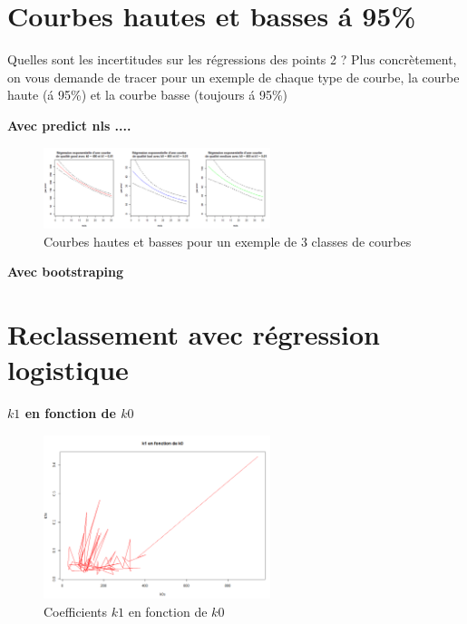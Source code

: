 \documentclass[12pt]{article}
\begin{document}
\section{Courbes hautes et basses \'a 95\%}

Quelles sont les incertitudes sur les r\'egressions des points 2 ? Plus concr\`etement, on
vous demande de tracer pour un exemple de chaque type de courbe, la courbe haute (\'a
95\%) et la courbe basse (toujours \'a 95\%)

\textbf{Avec predict nls ....}

\begin{figure}[H]
 \centering %
	\includegraphics[width=250px]{q3_predict_nls}
  \caption{\label{fig:q3_predict_nls} Courbes hautes et basses pour un exemple de 3 classes de courbes}
\end{figure}


\textbf{Avec bootstraping}


\newpage
\section{Reclassement avec r\'egression logistique}

\textbf{$k1$ en fonction de $k0$}

\begin{figure}[H]
 \centering %
	\includegraphics[width=250px]{k0_k1}
  \caption{\label{fig:k0_k1} Coefficients $k1$ en fonction de $k0$}
\end{figure}
 
\end{document}
